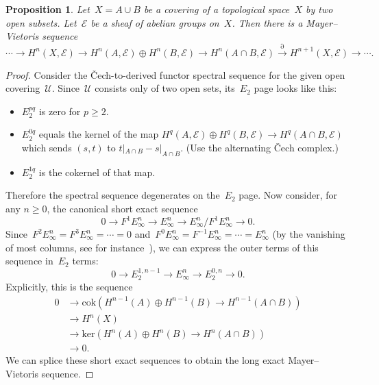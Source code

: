 \documentclass[10pt]{amsart}
\theoremstyle{definition}
\theoremstyle{plain}
\newtheorem{prop}[defn]{Proposition}
\theoremstyle{remark}
\newcommand{\E}{\mathcal{E}}
\newcommand{\U}{\mathcal{U}}
\newcommand{\lra}{\longrightarrow}
\begin{document}
\begin{prop}Let~$X = A \cup B$ be a covering of a topological space~$X$
by two open subsets. Let~$\E$ be a sheaf of abelian groups on~$X$. Then there
is a Mayer--Vietoris sequence
\[ \cdots \lra H^n(X, \E) \lra
  H^n(A, \E) \oplus H^n(B, \E) \lra
  H^n(A \cap B, \E) \stackrel{\partial}{\lra} H^{n+1}(X, \E) \lra \cdots. \]
\end{prop}
\begin{proof}Consider the Čech-to-derived functor spectral sequence for the
given open covering~$\U$. Since~$\U$ consists only of two open sets, its~$E_2$ page looks like this:
\begin{itemize}
\item $E_2^{pq}$ is zero for $p \geq 2$.
\item $E_2^{0q}$ equals the kernel of the map $H^q(A,\E) \oplus H^q(B,\E) \to H^q(A
\cap B,\E)$ which sends $(s,t)$ to $t|_{A \cap B} - s|_{A \cap B}$. (Use the
alternating Čech complex.)
\item $E_2^{1q}$ is the cokernel of that map.
\end{itemize}
Therefore the spectral sequence degenerates on the~$E_2$ page. Now
consider, for any $n \geq 0$, the canonical short exact sequence
\[ 0 \longrightarrow F^1 E_\infty^n \longrightarrow E_\infty^n
\longrightarrow E_\infty^n/F^1 E_\infty^n \longrightarrow 0. \]
Since~$F^2 E_\infty^n = F^3 E_\infty^n = \cdots = 0$ and~$F^0 E_\infty^n =
F^{-1} E_\infty^n = \cdots = E_\infty^n$ (by the vanishing of most
columns, see for instance~\cite{greenberg}),
we can express the outer terms of this sequence in~$E_2$ terms:
\[ 0 \longrightarrow E_2^{1,n-1} \longrightarrow E_\infty^n
\longrightarrow E_2^{0,n} \longrightarrow 0. \]
Explicitly, this is the sequence
\begin{align*}
  0 &\longrightarrow \mathrm{cok}(H^{n-1}(A) \oplus H^{n-1}(B) \to
H^{n-1}(A \cap B)) \\
  &\longrightarrow H^n(X) \\
  &\longrightarrow \mathrm{ker}(H^n(A) \oplus H^n(B) \to H^n(A \cap B)) \\
  &\longrightarrow 0.
\end{align*}
We can splice these short exact sequences to obtain the long exact
Mayer--Vietoris sequence.
\end{proof}
\end{document}
